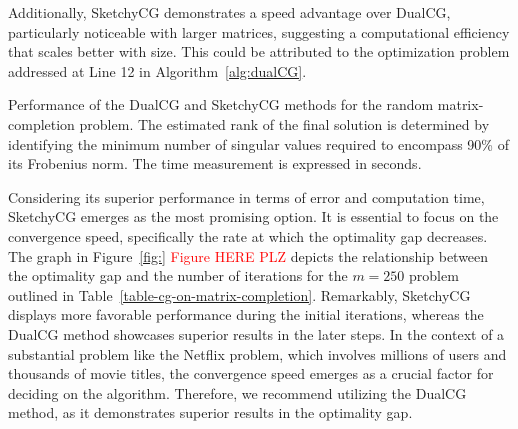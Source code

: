 \documentclass[10pt, twocolumn, reqno, a4paper,oneside]{amsart}
\numberwithin{equation}{section}
\numberwithin{theorem}{section}
\numberwithin{figure}{section}
\numberwithin{table}{section}
\numberwithin{theorem}{section}
\numberwithin{equation}{section}
\begin{document}
Additionally, SketchyCG demonstrates a speed advantage over DualCG, particularly noticeable with larger matrices, suggesting a computational efficiency that scales better with size.
This could be attributed to the optimization problem addressed at Line 12 in Algorithm~\ref{alg:dualCG}.
\begin{table}[!htb]
	\centering
	\caption{Performance of the DualCG and SketchyCG methods for the random matrix-completion problem.
		The estimated rank of the final solution is determined by identifying the minimum number of singular values required to encompass 90\% of its Frobenius norm. The time measurement is expressed in seconds. \label{table-cg-on-matrix-completion}}
\end{table}
Considering its superior performance in terms of error and computation time, SketchyCG emerges as the most promising option. It is essential to focus on the convergence speed, specifically the rate at which the optimality gap decreases. The graph in Figure~\ref{fig:} \textcolor{red}{Figure HERE PLZ} depicts the relationship between the optimality gap and the number of iterations for the $m = 250$ problem outlined in Table~\ref{table-cg-on-matrix-completion}. Remarkably, SketchyCG displays more favorable performance during the initial iterations, whereas the DualCG method showcases superior results in the later steps.
In the context of a substantial problem like the Netflix problem, which involves millions of users and thousands of movie titles, the convergence speed emerges as a crucial factor for deciding on the algorithm.
Therefore, we recommend utilizing the DualCG method, as it demonstrates superior results in the optimality gap.
\end{document}
